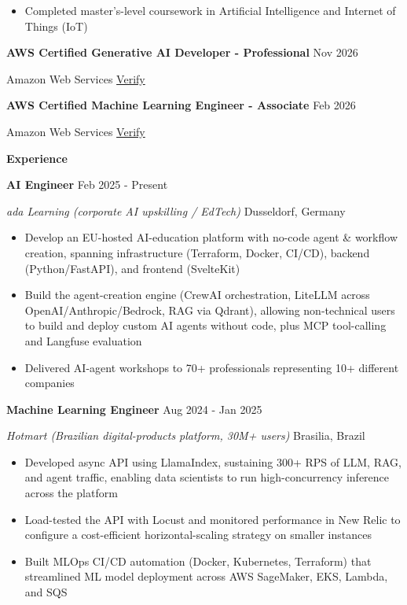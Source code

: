 \documentclass[a4paper,10pt]{article}
\begin{document}
\begin{itemize}[noitemsep, topsep=0pt, partopsep=0pt, parsep=0pt]
    \item Completed master's-level coursework in Artificial Intelligence and Internet of Things (IoT)
\end{itemize}

\vspace{4pt}

\textbf{AWS Certified Generative AI Developer - Professional} \hfill Nov 2026

Amazon Web Services \hfill \href{https://www.credly.com/badges/71a27f41-c743-4368-9bfd-155953591380/}{Verify}

\vspace{4pt}

\textbf{AWS Certified Machine Learning Engineer - Associate} \hfill Feb 2026

Amazon Web Services \hfill \href{https://www.credly.com/badges/2b4fec6e-76c6-424b-845f-84f9a6a9c0e5/}{Verify}

\begin{center}
    \textbf{Experience}
\end{center}

\textbf{AI Engineer} \hfill Feb 2025 - Present

\textit{ada Learning (corporate AI upskilling / EdTech)} \hfill Dusseldorf, Germany
\begin{itemize}[noitemsep, topsep=0pt, partopsep=0pt, parsep=0pt]
    \item Develop an EU-hosted AI-education platform with no-code agent \& workflow creation, spanning infrastructure (Terraform, Docker, CI/CD), backend (Python/FastAPI), and frontend (SvelteKit)
    \item Build the agent-creation engine (CrewAI orchestration, LiteLLM across OpenAI/Anthropic/Bedrock, RAG via Qdrant), allowing non-technical users to build and deploy custom AI agents without code, plus MCP tool-calling and Langfuse evaluation
    \item Delivered AI-agent workshops to 70+ professionals representing 10+ different companies
\end{itemize}

\vspace{4pt}

\textbf{Machine Learning Engineer} \hfill Aug 2024 - Jan 2025

\textit{Hotmart (Brazilian digital-products platform, 30M+ users)} \hfill Brasilia, Brazil
\begin{itemize}[noitemsep, topsep=0pt, partopsep=0pt, parsep=0pt]
    \item Developed async API using LlamaIndex, sustaining 300+ RPS of LLM, RAG, and agent traffic, enabling data scientists to run high-concurrency inference across the platform
    \item Load-tested the API with Locust and monitored performance in New Relic to configure a cost-efficient horizontal-scaling strategy on smaller instances
    \item Built MLOps CI/CD automation (Docker, Kubernetes, Terraform) that streamlined ML model deployment across AWS SageMaker, EKS, Lambda, and SQS
\end{itemize}
\end{document}
